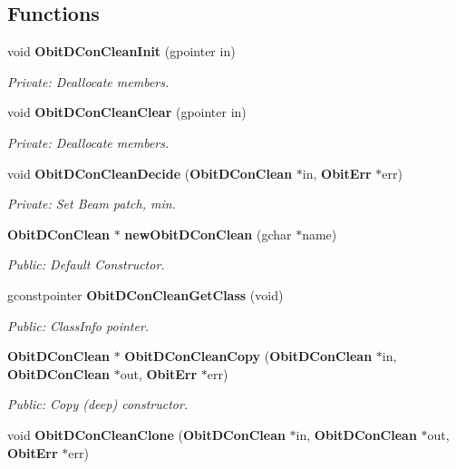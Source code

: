 \subsection*{Functions}
\begin{CompactItemize}
\item 
void {\bf Obit\-DCon\-Clean\-Init} (gpointer in)
\begin{CompactList}\small\item\em Private: Deallocate members. \item\end{CompactList}\item 
void {\bf Obit\-DCon\-Clean\-Clear} (gpointer in)
\begin{CompactList}\small\item\em Private: Deallocate members. \item\end{CompactList}\item 
void {\bf Obit\-DCon\-Clean\-Decide} ({\bf Obit\-DCon\-Clean} $\ast$in, {\bf Obit\-Err} $\ast$err)
\begin{CompactList}\small\item\em Private: Set Beam patch, min. \item\end{CompactList}\item 
{\bf Obit\-DCon\-Clean} $\ast$ {\bf new\-Obit\-DCon\-Clean} (gchar $\ast$name)
\begin{CompactList}\small\item\em Public: Default Constructor. \item\end{CompactList}\item 
gconstpointer {\bf Obit\-DCon\-Clean\-Get\-Class} (void)
\begin{CompactList}\small\item\em Public: Class\-Info pointer. \item\end{CompactList}\item 
{\bf Obit\-DCon\-Clean} $\ast$ {\bf Obit\-DCon\-Clean\-Copy} ({\bf Obit\-DCon\-Clean} $\ast$in, {\bf Obit\-DCon\-Clean} $\ast$out, {\bf Obit\-Err} $\ast$err)
\begin{CompactList}\small\item\em Public: Copy (deep) constructor. \item\end{CompactList}\item 
void {\bf Obit\-DCon\-Clean\-Clone} ({\bf Obit\-DCon\-Clean} $\ast$in, {\bf Obit\-DCon\-Clean} $\ast$out, {\bf Obit\-Err} $\ast$err)

\end{CompactItemize}
